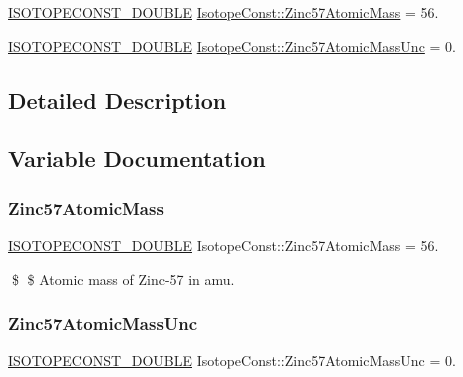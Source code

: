 \begin{DoxyCompactItemize}
\item 
\mbox{\hyperlink{group___isotope_const-_macros_ga8f45a7272ce02c0b4c65c44636ed719a}{I\+S\+O\+T\+O\+P\+E\+C\+O\+N\+S\+T\+\_\+\+D\+O\+U\+B\+LE}} \mbox{\hyperlink{group___isotope_const-_zinc-_zn57_ga7e2fbbe0a8dfef77a2afd20b7088fd19}{Isotope\+Const\+::\+Zinc57\+Atomic\+Mass}} = 56.
\item 
\mbox{\hyperlink{group___isotope_const-_macros_ga8f45a7272ce02c0b4c65c44636ed719a}{I\+S\+O\+T\+O\+P\+E\+C\+O\+N\+S\+T\+\_\+\+D\+O\+U\+B\+LE}} \mbox{\hyperlink{group___isotope_const-_zinc-_zn57_ga9ffb2ac71679a81c964906136a906f7a}{Isotope\+Const\+::\+Zinc57\+Atomic\+Mass\+Unc}} = 0.
\end{DoxyCompactItemize}


\subsection{Detailed Description}


\subsection{Variable Documentation}
\mbox{\label{group___isotope_const-_zinc-_zn57_ga7e2fbbe0a8dfef77a2afd20b7088fd19}} 
\subsubsection{\texorpdfstring{Zinc57\+Atomic\+Mass}{Zinc57AtomicMass}}
{\footnotesize\ttfamily \mbox{\hyperlink{group___isotope_const-_macros_ga8f45a7272ce02c0b4c65c44636ed719a}{I\+S\+O\+T\+O\+P\+E\+C\+O\+N\+S\+T\+\_\+\+D\+O\+U\+B\+LE}} Isotope\+Const\+::\+Zinc57\+Atomic\+Mass = 56.}

\$ \$ Atomic mass of Zinc-\/57 in amu. \mbox{\label{group___isotope_const-_zinc-_zn57_ga9ffb2ac71679a81c964906136a906f7a}} 
\subsubsection{\texorpdfstring{Zinc57\+Atomic\+Mass\+Unc}{Zinc57AtomicMassUnc}}
{\footnotesize\ttfamily \mbox{\hyperlink{group___isotope_const-_macros_ga8f45a7272ce02c0b4c65c44636ed719a}{I\+S\+O\+T\+O\+P\+E\+C\+O\+N\+S\+T\+\_\+\+D\+O\+U\+B\+LE}} Isotope\+Const\+::\+Zinc57\+Atomic\+Mass\+Unc = 0.}

